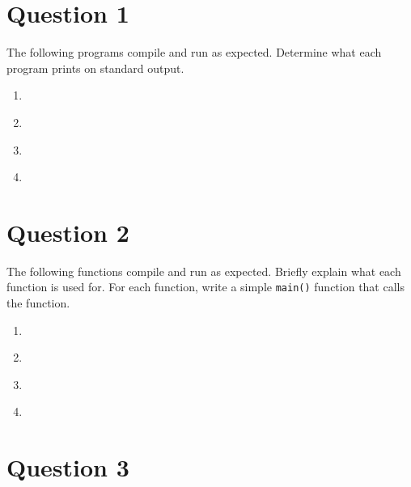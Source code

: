\documentclass[12pt,letterpaper,twoside]{article}
\begin{document}


\section*{Question 1}

The following programs compile and run as expected.
Determine what each program prints on standard output.

\lstset{language=c,tabsize=4}
\begin{enumerate}[label=(\alph*)]
\item \lstinline{}

\item \lstinline{}

\item \lstinline{}

\item \lstinline{}

\end{enumerate}

\newpage

\section*{Question 2}

The following functions compile and run as expected.
Briefly explain what each function is used for.
For each function, write a simple \texttt{main()} function that calls the function.

\lstset{language=c,tabsize=4}
\begin{enumerate}[label=(\alph*)]
\item \lstinline{}

\item \lstinline{}

\newpage
\item \lstinline{}

\item \lstinline{}

\end{enumerate}

\newpage

\section*{Question 3}
\end{document}
